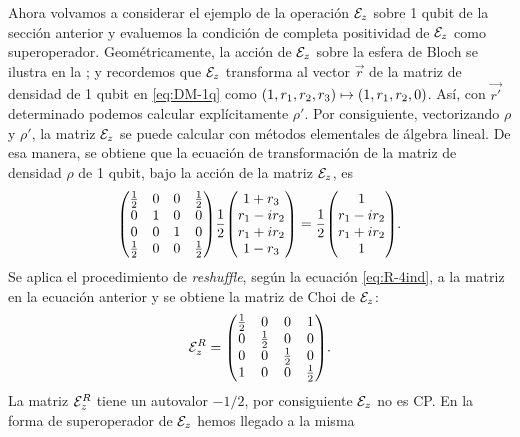 Ahora volvamos a considerar el ejemplo de la operación $\mathcal{E}_z$ 
sobre 1 qubit de la sección anterior y evaluemos la condición de 
completa positividad de $\mathcal{E}_z$ como superoperador. 
Geométricamente, la acción de $\mathcal{E}_z$ sobre la 
esfera de Bloch se ilustra en la ;
y recordemos que $\mathcal{E}_z$ transforma al vector $\vec{r}$ 
de la matriz de densidad de 1 qubit en \eqref{eq:DM-1q} 
como $\qty(1,r_1,r_2,r_3)\mapsto\qty(1,r_1,r_2,0)$. Así, 
con $\vec{r'}$ determinado podemos calcular 
explícitamente $\rho'$.
Por consiguiente, vectorizando $\rho$ y $\rho'$, la matriz $\mathcal{E}_z$ 
se puede calcular con métodos elementales de álgebra lineal. 
De esa manera, se obtiene que la ecuación de transformación 
de la matriz de densidad $\rho$ de 1 qubit, bajo la
acción de la matriz $\mathcal{E}_z$, es
\begin{align}
\mqty(
\frac{1}{2} & 0 & 0 & \frac{1}{2} \\
0 & 1 & 0 & 0 \\
0 & 0 & 1 & 0 \\
\frac{1}{2} & 0 & 0 & \frac{1}{2} \\
)
\frac{1}{2}
\mqty(
1+r_3\\r_1-ir_2\\r_1+ir_2\\1-r_3
)
=
\frac{1}{2}
\mqty(
1\\r_1-ir_2\\r_1+ir_2\\1
).
\end{align}
Se aplica el procedimiento de \textit{reshuffle},
según la ecuación \eqref{eq:R-4ind}, a la matriz en la ecuación 
anterior y se obtiene la matriz de Choi de $\mathcal{E}_z$:
\begin{align}
\E_z^R=
\mqty(
\frac{1}{2} & 0 & 0 & 1 \\
0 & \frac{1}{2} & 0 & 0 \\
0 & 0 & \frac{1}{2} & 0 \\
1 & 0 & 0 & \frac{1}{2} 
).
\end{align}
La matriz $\mathcal{E}_z^R$ tiene un autovalor $-1/2$, 
por consiguiente $\mathcal{E}_z$ no es CP. 
En la forma de superoperador de $\mathcal{E}_z$ hemos llegado a la misma

